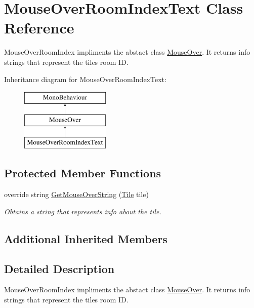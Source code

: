 \hypertarget{class_mouse_over_room_index_text}{}\section{Mouse\+Over\+Room\+Index\+Text Class Reference}
\label{class_mouse_over_room_index_text}


Mouse\+Over\+Room\+Index impliments the abstact class \hyperlink{class_mouse_over}{Mouse\+Over}. It returns info strings that represent the tiles room ID.  


Inheritance diagram for Mouse\+Over\+Room\+Index\+Text\+:\begin{figure}[H]
\begin{center}
\leavevmode
\includegraphics[height=3.000000cm]{class_mouse_over_room_index_text}
\end{center}
\end{figure}
\subsection*{Protected Member Functions}
\begin{DoxyCompactItemize}
\item 
override string \hyperlink{class_mouse_over_room_index_text_ac6c8ed4b482cbb570fc8989640d622db}{Get\+Mouse\+Over\+String} (\hyperlink{class_tile}{Tile} tile)
\begin{DoxyCompactList}\small\item\em Obtains a string that represents info about the tile. \end{DoxyCompactList}\end{DoxyCompactItemize}
\subsection*{Additional Inherited Members}


\subsection{Detailed Description}
Mouse\+Over\+Room\+Index impliments the abstact class \hyperlink{class_mouse_over}{Mouse\+Over}. It returns info strings that represent the tiles room ID. 



